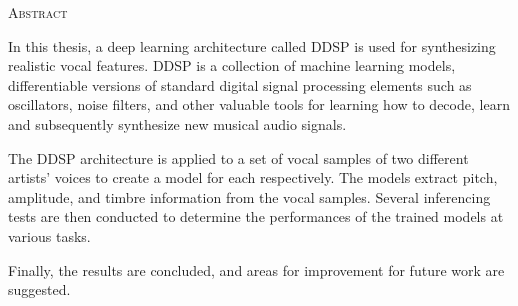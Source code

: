 \begin{center}
  \textsc{Abstract}
\end{center}

\noindent

In this thesis, a deep learning architecture called DDSP is used for synthesizing realistic vocal features. DDSP is a collection of machine learning models, differentiable versions of standard digital signal processing elements such as oscillators, noise filters, and other valuable tools for learning how to decode, learn and subsequently synthesize new musical audio signals.

The DDSP architecture is applied to a set of vocal samples of two different artists' voices to create a model for each respectively. The models extract pitch, amplitude, and timbre information from the vocal samples. Several inferencing tests are then conducted to determine the performances of the trained models at various tasks.

Finally, the results are concluded, and areas for improvement for future work are suggested.